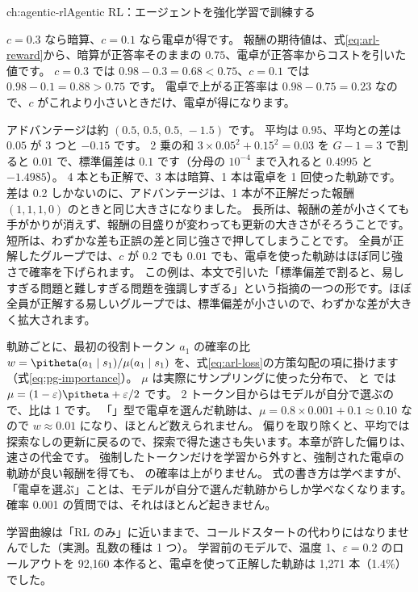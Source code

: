 \begin{answers}{ch:agentic-rl}{Agentic RL：エージェントを強化学習で訓練する}
\item $c=0.3$ なら暗算、$c=0.1$ なら電卓が得です。
報酬の期待値は、式\eqref{eq:arl-reward}から、暗算が正答率そのままの $0.75$、電卓が正答率からコストを引いた値です。
$c=0.3$ では $0.98-0.3=0.68<0.75$、$c=0.1$ では $0.98-0.1=0.88>0.75$ です。
電卓で上がる正答率は $0.98-0.75=0.23$ なので、$c$ がこれより小さいときだけ、電卓が得になります。
\item アドバンテージは約 $(0.5,\,0.5,\,0.5,\,-1.5)$ です。
平均は $0.95$、平均との差は $0.05$ が 3 つと $-0.15$ です。
2 乗の和 $3\times0.05^2+0.15^2=0.03$ を $G-1=3$ で割ると $0.01$ で、標準偏差は $0.1$ です（分母の $10^{-4}$ まで入れると $0.4995$ と $-1.4985$）。
4 本とも正解で、3 本は暗算、1 本は電卓を 1 回使った軌跡です。
差は 0.2 しかないのに、アドバンテージは、1 本が不正解だった報酬 $(1,1,1,0)$ のときと同じ大きさになりました。
長所は、報酬の差が小さくても手がかりが消えず、報酬の目盛りが変わっても更新の大きさがそろうことです。
短所は、わずかな差も正誤の差と同じ強さで押してしまうことです。
全員が正解したグループでは、$c$ が $0.2$ でも $0.01$ でも、電卓を使った軌跡はほぼ同じ強さで確率を下げられます。
この例は、本文で引いた「標準偏差で割ると、易しすぎる問題と難しすぎる問題を強調しすぎる」という指摘\cite{liu2025understanding}の一つの形です。ほぼ全員が正解する易しいグループでは、標準偏差が小さいので、わずかな差が大きく拡大されます。
\item 軌跡ごとに、最初の役割トークン $a_1$ の確率の比 $w=\pitheta(a_1\mid s_1)/\mu(a_1\mid s_1)$ を、式\eqref{eq:arl-loss}の方策勾配の項に掛けます（式\eqref{eq:pg-importance}）。
$\mu$ は実際にサンプリングに使った分布で、 と  では $\mu=(1-\varepsilon)\pitheta+\varepsilon/2$ です。
2 トークン目からはモデルが自分で選ぶので、比は 1 です。
「」型で電卓を選んだ軌跡は、$\mu=0.8\times0.001+0.1\approx0.10$ なので $w\approx0.01$ になり、ほとんど数えられません。
偏りを取り除くと、平均では探索なしの更新に戻るので、探索で得た速さも失います。本章が許した偏りは、速さの代金です。
強制したトークンだけを学習から外すと、強制された電卓の軌跡が良い報酬を得ても、 の確率は上がりません。
式の書き方は学べますが、「電卓を選ぶ」ことは、モデルが自分で選んだ軌跡からしか学べなくなります。
確率 0.001 の質問では、それはほとんど起きません。
\item 学習曲線は「RL のみ」に近いままで、コールドスタートの代わりにはなりませんでした（実測。乱数の種は 1 つ）。
学習前のモデルで、温度 1、$\varepsilon=0.2$ のロールアウトを 92,160 本作ると、電卓を使って正解した軌跡は 1,271 本（1.4\%）でした。

\end{answers}
